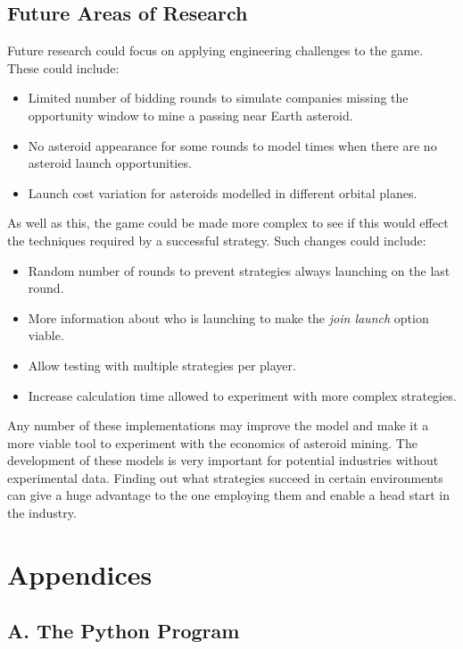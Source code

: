 \documentclass[11pt, twoside]{article}
\begin{document}
\subsection*{Future Areas of Research}
Future research could focus on applying engineering challenges to the game. These could include:

\begin{itemize}
	\item Limited number of bidding rounds to simulate companies missing the opportunity window to mine a passing near Earth asteroid.
	\item No asteroid appearance for some rounds to model times when there are no asteroid launch opportunities.
	\item Launch cost variation for asteroids modelled in different orbital planes.
\end{itemize}

As well as this, the game could be made more complex to see if this would effect the techniques required by a successful strategy. Such changes could include:

\begin{itemize}
	\item Random number of rounds to prevent strategies always launching on the last round.
	\item More information about who is launching to make the \textit{join launch} option viable.
	\item Allow testing with multiple strategies per player.
	\item Increase calculation time allowed to experiment with more complex strategies.
\end{itemize}

Any number of these implementations may improve the model and make it a more viable tool to experiment with the economics of asteroid mining. The development of these models is very important for potential industries without experimental data. Finding out what strategies succeed in certain environments can give a huge advantage to the one employing them and enable a head start in the industry.

\newpage



\newpage
\section{Appendices}
\renewcommand{\thesubsection}{\thesection.\alph{subsection}}
\subsection*{A. The Python Program}
\end{document}
